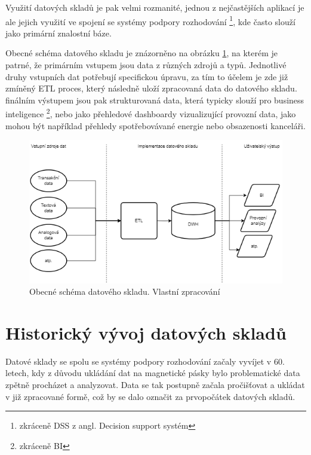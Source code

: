 \documentclass[
  digital,     %
  twoside,     %
  lof,         %
  lot,         %
]{fithesis4}
\begin{document}
Využití datových skladů je pak velmi rozmanité, jednou z nejčastějších aplikací je ale
jejich využití ve spojení se systémy podpory rozhodování \footnote{zkráceně DSS z angl. Decision support
systém}, kde často slouží jako primární znalostní báze. \parencite[s.~2]{Inmon2005}

Obecné schéma datového skladu je znázorněno na obrázku \ref{fig:dwh_schema}, na kterém je patrné, že primárním vstupem jsou data z různých zdrojů a typů. Jednotlivé druhy vstupních dat potřebují specifickou úpravu, za tím to účelem je zde již zmíněný ETL proces, který následně uloží zpracovaná data do datového skladu. finálním výstupem jsou pak strukturovaná data, která typicky slouží pro business inteligence \footnote{zkráceně BI}, nebo jako přehledové dashboardy vizualizující provozní data, jako mohou být například přehledy spotřebovávané energie nebo obsazenosti kanceláři.

\begin{figure}[h]
  \begin{center}
          \includegraphics[width=12cm]{img/dwh_schma.png}
  \end{center}
  \caption{Obecné schéma datového skladu. Vlastní zpracování}
  \label{fig:dwh_schema}
\end{figure}  



\section{Historický vývoj datových skladů}
Datové sklady se spolu se systémy podpory rozhodování začaly vyvíjet v 60. letech,
kdy z důvodu ukládání dat na magnetické pásky bylo problematické data zpětně procházet a
analyzovat. Data se tak postupně začala pročišťovat a ukládat v již zpracované formě, což by
se dalo označit za prvopočátek datových skladů.\parencite[s.~2]{Inmon2005}
\end{document}
